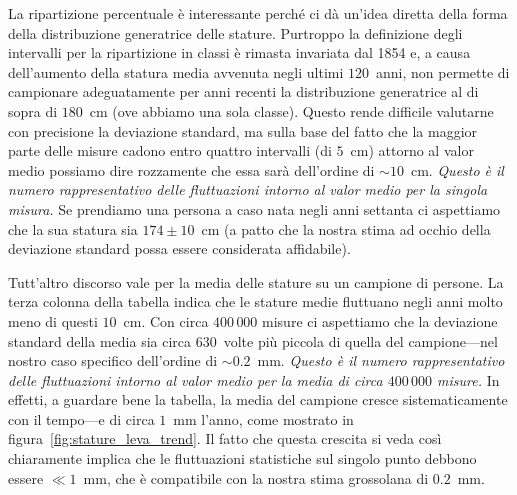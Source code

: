 La ripartizione percentuale è interessante perché ci dà un'idea diretta
della forma della distribuzione generatrice delle stature. Purtroppo la
definizione degli intervalli per la ripartizione in classi è rimasta
invariata dal 1854 e, a causa dell'aumento della statura media avvenuta
negli ultimi $120$~anni, non permette di campionare adeguatamente per anni
recenti la distribuzione generatrice al di sopra di $180$~cm (ove abbiamo
una sola classe). Questo rende difficile valutarne con precisione la
deviazione standard, ma sulla base del fatto che la maggior parte delle
misure cadono entro quattro intervalli (di $5$~cm) attorno al valor medio
possiamo dire rozzamente che essa sarà dell'ordine di $\sim 10$~cm.
\emph{Questo è il numero rappresentativo delle fluttuazioni intorno
  al valor medio per la singola misura.} Se prendiamo una persona a caso
nata negli anni settanta ci aspettiamo che la sua statura sia $174 \pm 10$~cm
(a patto che la nostra stima ad occhio della deviazione standard possa essere
considerata affidabile).

Tutt'altro discorso vale per la media delle stature su un campione di
persone. La terza colonna della tabella indica che le stature medie
fluttuano negli anni molto meno di questi $10$~cm. Con circa $400\,000$
misure ci aspettiamo che la deviazione standard della media sia circa
$630$~volte più piccola di quella del campione---nel nostro caso
specifico dell'ordine di $\sim 0.2$~mm.
\emph{Questo è il numero rappresentativo delle fluttuazioni intorno al
  valor medio per la media di circa $400\,000$ misure.}
In effetti, a guardare bene la tabella, la media del campione cresce
sistematicamente con il tempo---e di circa $1$~mm l'anno, come mostrato in
figura~\ref{fig:stature_leva_trend}. Il fatto che questa crescita si veda così
chiaramente implica che le fluttuazioni statistiche sul singolo punto
debbono essere $\ll 1$~mm, che è compatibile con la nostra stima grossolana
di $0.2$~mm.




